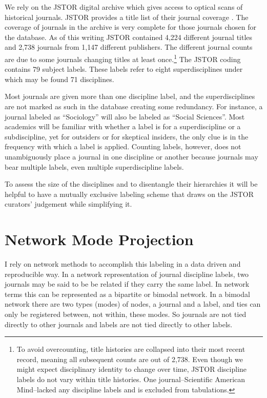 \documentclass[]{book}
\let\rmarkdownfootnote\footnote%
\def\footnote{\protect\rmarkdownfootnote}
\begin{document}
We rely on the JSTOR digital archive which gives access to optical scans
of historical journals. JSTOR provides a title list of their journal
coverage \citep{JSTOR2018Title}. The coverage of journals in the archive
is very complete for those journals chosen for the database. As of this
writing JSTOR contained 4,224 different journal titles and 2,738
journals from 1,147 different publishers. The different journal counts
are due to some journals changing titles at least once.\footnote{To
  avoid overcounting, title histories are collapsed into their most
  recent record, meaning all subsequent counts are out of 2,738. Even
  though we might expect disciplinary identity to change over time,
  JSTOR discipline labels do not vary within title histories. One
  journal--Scientific American Mind--lacked any discipline labels and is
  excluded from tabulations.} The JSTOR coding contains 79 subject
labels. These labels refer to eight superdisciplines under which may be
found 71 disciplines.

Most journals are given more than one discipline label, and the
superdisciplines are not marked as such in the database creating some
redundancy. For instance, a journal labeled as ``Sociology'' will also
be labeled as ``Social Sciences''. Most academics will be familiar with
whether a label is for a superdiscipline or a subdiscipline, yet for
outsiders or for skeptical insiders, the only clue is in the frequency
with which a label is applied. Counting labels, however, does not
unambiguously place a journal in one discipline or another because
journals may bear multiple labels, even multiple superdiscipline labels.

To assess the size of the disciplines and to disentangle their
hierarchies it will be helpful to have a mutually exclusive labeling
scheme that draws on the JSTOR curators' judgement while simplifying it.

\section{Network Mode Projection}\label{network-mode-projection}

I rely on network methods to accomplish this labeling in a data driven
and reproducible way. In a network representation of journal discipline
labels, two journals may be said to be be related if they carry the same
label. In network terms this can be represented as a bipartite or
bimodal network. In a bimodal network there are two types (modes) of
nodes, a journal and a label, and ties can only be registered between,
not within, these modes. So journals are not tied directly to other
journals and labels are not tied directly to other labels.
\end{document}
